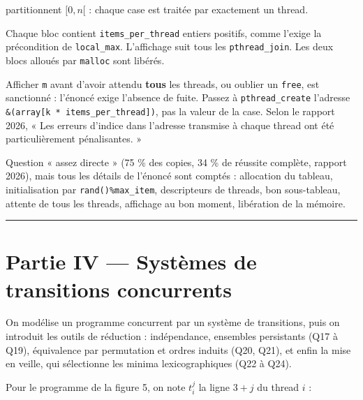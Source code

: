 \documentclass[11pt,a4paper]{article}
\begin{document}
partitionnent \([0,n[\) : chaque case est traitée par exactement un thread.

Chaque bloc contient \texttt{items\_per\_thread} entiers positifs, comme l'exige la précondition de \texttt{local\_max}. L'affichage suit tous les \texttt{pthread\_join}. Les deux blocs alloués par \texttt{malloc} sont libérés.

\begin{piege}

Afficher \texttt{m} avant d'avoir attendu \textbf{tous} les threads, ou oublier un \texttt{free}, est sanctionné : l'énoncé exige l'absence de fuite. Passez à \texttt{pthread\_create} l'adresse \texttt{\&(\allowbreak{}array{[}k\ *\ items\_per\_thread{]}\allowbreak{})\allowbreak{}}, pas la valeur de la case. Selon le rapport 2026, « Les erreurs d'indice dans l'adresse transmise à chaque thread ont été particulièrement pénalisantes. »

\end{piege}

\begin{jury}

Question « assez directe » (75 \% des copies, 34 \% de réussite complète, rapport 2026), mais tous les détails de l'énoncé sont comptés : allocation du tableau, initialisation par \texttt{rand()\%max\_item}, descripteurs de threads, bon sous-tableau, attente de tous les threads, affichage au bon moment, libération de la mémoire.

\end{jury}

\begin{center}\rule{0.5\linewidth}{0.5pt}\end{center}

\hypertarget{partie-iv-systuxe8mes-de-transitions-concurrents}{%
\section{Partie IV --- Systèmes de transitions concurrents}\label{partie-iv-systuxe8mes-de-transitions-concurrents}}

On modélise un programme concurrent par un système de transitions, puis on introduit les outils de réduction : indépendance, ensembles persistants (Q17 à Q19), équivalence par permutation et ordres induits (Q20, Q21), et enfin la mise en veille, qui sélectionne les minima lexicographiques (Q22 à Q24).

Pour le programme de la figure 5, on note \(t_i^j\) la ligne \(3+j\) du thread \(i\) :
\end{document}
